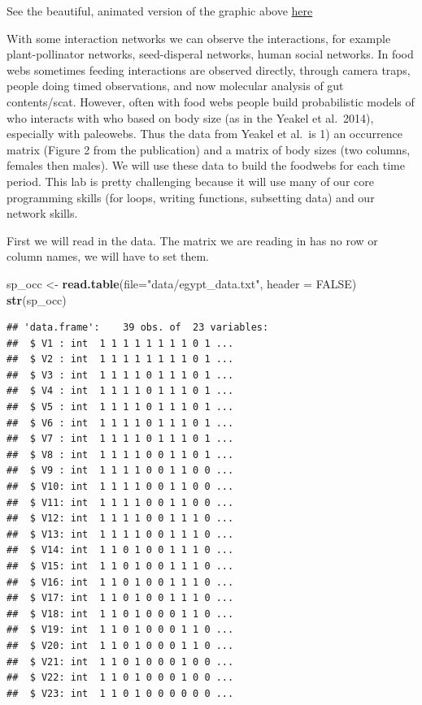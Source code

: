 \documentclass[
]{article}
\newenvironment{Shaded}{\begin{snugshade}}{\end{snugshade}}
\newcommand{\AttributeTok}[1]{\textcolor[rgb]{0.13,0.29,0.53}{#1}}
\newcommand{\ConstantTok}[1]{\textcolor[rgb]{0.56,0.35,0.01}{#1}}
\newcommand{\FunctionTok}[1]{\textcolor[rgb]{0.13,0.29,0.53}{\textbf{#1}}}
\newcommand{\NormalTok}[1]{#1}
\newcommand{\OtherTok}[1]{\textcolor[rgb]{0.56,0.35,0.01}{#1}}
\newcommand{\StringTok}[1]{\textcolor[rgb]{0.31,0.60,0.02}{#1}}
\begin{document}
See the beautiful, animated version of the graphic above
\href{https://infograficos.estadao.com.br/public/cidades/extincoes-egito/}{here}

With some interaction networks we can observe the interactions, for
example plant-pollinator networks, seed-disperal networks, human social
networks. In food webs sometimes feeding interactions are observed
directly, through camera traps, people doing timed observations, and now
molecular analysis of gut contents/scat. However, often with food webs
people build probabilistic models of who interacts with who based on
body size (as in the Yeakel et al.~2014), especially with paleowebs.
Thus the data from Yeakel et al.~is 1) an occurrence matrix (Figure 2
from the publication) and a matrix of body sizes (two columns, females
then males). We will use these data to build the foodwebs for each time
period. This lab is pretty challenging because it will use many of our
core programming skills (for loops, writing functions, subsetting data)
and our network skills.

First we will read in the data. The matrix we are reading in has no row
or column names, we will have to set them.

\begin{Shaded}
\begin{Highlighting}[]
\NormalTok{sp\_occ }\OtherTok{\textless{}{-}} \FunctionTok{read.table}\NormalTok{(}\AttributeTok{file=}\StringTok{"data/egypt\_data.txt"}\NormalTok{, }\AttributeTok{header =} \ConstantTok{FALSE}\NormalTok{)}
\FunctionTok{str}\NormalTok{(sp\_occ)}
\end{Highlighting}
\end{Shaded}

\begin{verbatim}
## 'data.frame':    39 obs. of  23 variables:
##  $ V1 : int  1 1 1 1 1 1 1 1 0 1 ...
##  $ V2 : int  1 1 1 1 1 1 1 1 0 1 ...
##  $ V3 : int  1 1 1 1 0 1 1 1 0 1 ...
##  $ V4 : int  1 1 1 1 0 1 1 1 0 1 ...
##  $ V5 : int  1 1 1 1 0 1 1 1 0 1 ...
##  $ V6 : int  1 1 1 1 0 1 1 1 0 1 ...
##  $ V7 : int  1 1 1 1 0 1 1 1 0 1 ...
##  $ V8 : int  1 1 1 1 0 0 1 1 0 1 ...
##  $ V9 : int  1 1 1 1 0 0 1 1 0 0 ...
##  $ V10: int  1 1 1 1 0 0 1 1 0 0 ...
##  $ V11: int  1 1 1 1 0 0 1 1 0 0 ...
##  $ V12: int  1 1 1 1 0 0 1 1 1 0 ...
##  $ V13: int  1 1 1 1 0 0 1 1 1 0 ...
##  $ V14: int  1 1 0 1 0 0 1 1 1 0 ...
##  $ V15: int  1 1 0 1 0 0 1 1 1 0 ...
##  $ V16: int  1 1 0 1 0 0 1 1 1 0 ...
##  $ V17: int  1 1 0 1 0 0 1 1 1 0 ...
##  $ V18: int  1 1 0 1 0 0 0 1 1 0 ...
##  $ V19: int  1 1 0 1 0 0 0 1 1 0 ...
##  $ V20: int  1 1 0 1 0 0 0 1 1 0 ...
##  $ V21: int  1 1 0 1 0 0 0 1 0 0 ...
##  $ V22: int  1 1 0 1 0 0 0 1 0 0 ...
##  $ V23: int  1 1 0 1 0 0 0 0 0 0 ...
\end{verbatim}
\end{document}
